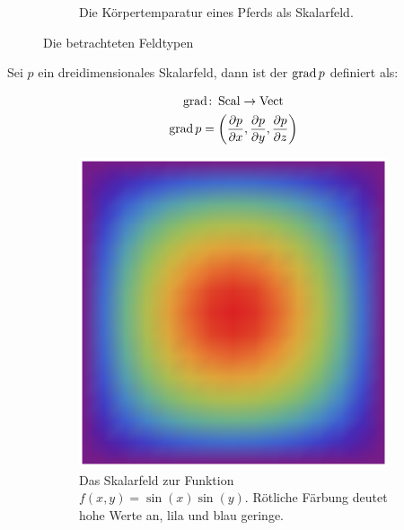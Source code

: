 \begin{figure}
\begin{subfigure}[b]{0.5\textwidth}
		\caption{Die Körpertemparatur eines Pferds als Skalarfeld.}
		\label{fig:mathematics_scalarfield}
	\end{subfigure}
	\caption{Die betrachteten Feldtypen}
\end{figure}

Sei $p$ ein dreidimensionales Skalarfeld, dann ist der 
$\operatorname*{grad} p$ definiert als:

\begin{gather}
\operatorname*{grad} \colon \operatorname*{Scal} \to \operatorname*{Vect} \\
\operatorname*{grad} p
=
\left( \frac{\partial p}{\partial x},\frac{\partial p}{\partial y},\frac{\partial p}{\partial z} \right)
\end{gather}

\begin{figure}[ht]
	\begin{subfigure}[b]{0.5\textwidth}
		\centering
		\includegraphics[width=\textwidth]{images/scalar_field_to_show_gradient}
		\caption{Das Skalarfeld zur Funktion $f(x,y) = \sin(x)\sin(y)$. Rötliche Färbung deutet hohe Werte an, lila und blau geringe.}
		\label{fig:mathematics_sample_scalar_field}
	\end{subfigure}
	~
	\begin{subfigure}[b]{0.5\textwidth}
		\centering

\end{subfigure}
\end{figure}
